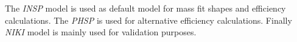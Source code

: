 The \textit{INSP} model is used as default model for mass fit shapes and efficiency calculations. The \textit{PHSP} is used for alternative efficiency calculations. Finally \textit{NIKI} model is mainly used for validation purposes.

%
%





